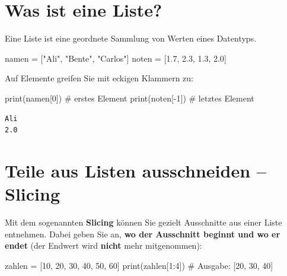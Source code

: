 \documentclass[
  letterpaper,
  DIV=11,
  numbers=noendperiod]{scrreprt}
\newenvironment{Shaded}{\begin{snugshade}}{\end{snugshade}}
\newcommand{\BuiltInTok}[1]{\textcolor[rgb]{0.00,0.23,0.31}{#1}}
\newcommand{\CommentTok}[1]{\textcolor[rgb]{0.37,0.37,0.37}{#1}}
\newcommand{\DecValTok}[1]{\textcolor[rgb]{0.68,0.00,0.00}{#1}}
\newcommand{\FloatTok}[1]{\textcolor[rgb]{0.68,0.00,0.00}{#1}}
\newcommand{\NormalTok}[1]{\textcolor[rgb]{0.00,0.23,0.31}{#1}}
\newcommand{\OperatorTok}[1]{\textcolor[rgb]{0.37,0.37,0.37}{#1}}
\newcommand{\StringTok}[1]{\textcolor[rgb]{0.13,0.47,0.30}{#1}}
\begin{document}
\section{Was ist eine Liste?}\label{was-ist-eine-liste}

Eine Liste ist eine geordnete Sammlung von Werten eines Datentyps.

\begin{Shaded}
\begin{Highlighting}[]
\NormalTok{namen }\OperatorTok{=}\NormalTok{ [}\StringTok{"Ali"}\NormalTok{, }\StringTok{"Bente"}\NormalTok{, }\StringTok{"Carlos"}\NormalTok{]}
\NormalTok{noten }\OperatorTok{=}\NormalTok{ [}\FloatTok{1.7}\NormalTok{, }\FloatTok{2.3}\NormalTok{, }\FloatTok{1.3}\NormalTok{, }\FloatTok{2.0}\NormalTok{]}
\end{Highlighting}
\end{Shaded}

Auf Elemente greifen Sie mit eckigen Klammern zu:

\begin{Shaded}
\begin{Highlighting}[]
\BuiltInTok{print}\NormalTok{(namen[}\DecValTok{0}\NormalTok{])  }\CommentTok{\# erstes Element}
\BuiltInTok{print}\NormalTok{(noten[}\OperatorTok{{-}}\DecValTok{1}\NormalTok{]) }\CommentTok{\# letztes Element}
\end{Highlighting}
\end{Shaded}

\begin{verbatim}
Ali
2.0
\end{verbatim}

\section{Teile aus Listen ausschneiden --
Slicing}\label{teile-aus-listen-ausschneiden-slicing}

Mit dem sogenannten \textbf{Slicing} können Sie gezielt Ausschnitte aus
einer Liste entnehmen. Dabei geben Sie an, \textbf{wo der Ausschnitt
beginnt und wo er endet} (der Endwert wird \textbf{nicht} mehr
mitgenommen):

\begin{Shaded}
\begin{Highlighting}[]
\NormalTok{zahlen }\OperatorTok{=}\NormalTok{ [}\DecValTok{10}\NormalTok{, }\DecValTok{20}\NormalTok{, }\DecValTok{30}\NormalTok{, }\DecValTok{40}\NormalTok{, }\DecValTok{50}\NormalTok{, }\DecValTok{60}\NormalTok{]}
\BuiltInTok{print}\NormalTok{(zahlen[}\DecValTok{1}\NormalTok{:}\DecValTok{4}\NormalTok{])  }\CommentTok{\# Ausgabe: [20, 30, 40]}
\end{Highlighting}
\end{Shaded}
\end{document}
